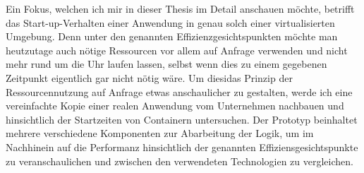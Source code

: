 Ein Fokus, welchen ich mir in dieser Thesis im Detail anschauen möchte, betrifft das Start-up-Verhalten einer Anwendung in genau solch einer virtualisierten Umgebung. Denn unter den genannten Effizienzgesichtspunkten möchte man heutzutage auch nötige Ressourcen vor allem auf Anfrage verwenden und nicht mehr rund um die Uhr laufen lassen, selbst wenn dies zu einem gegebenen Zeitpunkt eigentlich gar nicht nötig wäre. Um diesidas Prinzip der Ressourcennutzung auf Anfrage etwas anschaulicher zu gestalten, werde ich eine vereinfachte Kopie einer realen Anwendung vom Unternehmen nachbauen und hinsichtlich der Startzeiten von Containern untersuchen. Der Prototyp beinhaltet mehrere verschiedene Komponenten zur Abarbeitung der Logik, um im Nachhinein auf die Performanz hinsichtlich der genannten Effiziensgesichtspunkte zu veranschaulichen und zwischen den verwendeten Technologien zu vergleichen.

